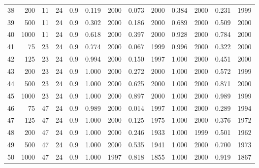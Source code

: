 \documentclass{article}
\begin{document}
\begin{table}[ht]
\begin{center}
\begin{tabular}{rrrrrrrrrrrrr}
  38 & 200 & 11 & 24 & 0.9 & 0.119 & 2000 & 0.073 & 2000 & 0.384 & 2000 & 0.231 & 1999 \\ 
  39 & 500 & 11 & 24 & 0.9 & 0.302 & 2000 & 0.186 & 2000 & 0.689 & 2000 & 0.509 & 2000 \\ 
  40 & 1000 & 11 & 24 & 0.9 & 0.618 & 2000 & 0.397 & 2000 & 0.928 & 2000 & 0.784 & 2000 \\ 
   \hline
41 & 75 & 23 & 24 & 0.9 & 0.774 & 2000 & 0.067 & 1999 & 0.996 & 2000 & 0.322 & 2000 \\ 
  42 & 125 & 23 & 24 & 0.9 & 0.994 & 2000 & 0.150 & 1997 & 1.000 & 2000 & 0.451 & 2000 \\ 
  43 & 200 & 23 & 24 & 0.9 & 1.000 & 2000 & 0.272 & 2000 & 1.000 & 2000 & 0.572 & 1999 \\ 
  44 & 500 & 23 & 24 & 0.9 & 1.000 & 2000 & 0.625 & 2000 & 1.000 & 2000 & 0.871 & 2000 \\ 
  45 & 1000 & 23 & 24 & 0.9 & 1.000 & 2000 & 0.897 & 2000 & 1.000 & 2000 & 0.989 & 1999 \\ 
   \hline
46 & 75 & 47 & 24 & 0.9 & 0.989 & 2000 & 0.014 & 1997 & 1.000 & 2000 & 0.289 & 1994 \\ 
  47 & 125 & 47 & 24 & 0.9 & 1.000 & 2000 & 0.125 & 1975 & 1.000 & 2000 & 0.376 & 1972 \\ 
  48 & 200 & 47 & 24 & 0.9 & 1.000 & 2000 & 0.246 & 1933 & 1.000 & 1999 & 0.501 & 1962 \\ 
  49 & 500 & 47 & 24 & 0.9 & 1.000 & 2000 & 0.535 & 1941 & 1.000 & 2000 & 0.700 & 1973 \\ 
  50 & 1000 & 47 & 24 & 0.9 & 1.000 & 1997 & 0.818 & 1855 & 1.000 & 2000 & 0.919 & 1867 \\ 
   \hline
\end{tabular}
\end{center}
\end{table}
\end{document}
